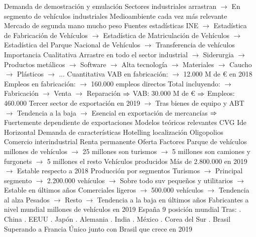 \documentclass{nuevotema}
\begin{document}
\begin{esquemal}
				\4[] Demanda de demostración y emulación
				\4[] Sectores industriales arrastran
				\4[] $\to$ En segmento de vehículos industriales
				\4[] Medioambiente cada vez más relevante
				\4[] Mercado de segunda mano mucho peso
				\4 Fuentes estadísticas
				\4[] INE
				\4[] $\to$ Estadística de Fabricación de Vehículos
				\4[] $\to$ Estadística de Matriculación de Vehículos
				\4[] $\to$ Estadística del Parque Nacional de Vehículos
				\4[] $\to$ Transferencia de vehículos
			\3 Importancia
				\4 Cualitativa
				\4[] Arrastre en todo el sector industrial
				\4[] $\to$ Siderurgia
				\4[] $\to$ Productos metálicos
				\4[] $\to$ Software
				\4[] $\to$ Alta tecnología
				\4[] $\to$ Materiales
				\4[] $\to$ Caucho
				\4[] $\to$ Plásticos
				\4[] $\to$ ...
				\4 Cuantitativa
				\4[] VAB en fabricación:
				\4[] $\to$ 12.000 M de € en 2018
				\4[] Empleos en fabricación:
				\4[] $\to$ 160.000 empleos directos
				\4[] Total incluyendo:
				\4[] $\to$ Fabricación
				\4[] $\to$ Venta
				\4[] $\to$ Reparación
				\4[] $\Rightarrow$ VAB: 30.000 M de €
				\4[] $\Rightarrow$ Empleos: 460.000
				\4[] Tercer sector de exportación en 2019
				\4[] $\to$ Tras bienes de equipo y ABT
				\4[] $\to$ Tendencia a la baja
				\4[] $\to$ Esencial en exportación de mercancías
				\4[] $\Rightarrow$ Fuertemente dependiente de exportaciones
			\3 Modelos teóricos relevantes
				\4 CVG
				\4 Ide Horizontal
				\4 Demanda de características
				\4 Hotelling localización
				\4 Oligopolios
				\4 Comercio interindustrial
				\4 Renta permanente
			\3 Oferta
				\4 Factores
				\4 Parque de vehículos
				 millones de vehículos
				\4[] $\to$ 25 millones son turismos
				\4[] $\to$ 5 millones son camiones y furgonets
				\4[] $\to$ 5 millones el resto
				\4 Vehículos producidos
				\4[] Más de 2.800.000 en 2019
				\4[] $\to$ Estable respecto a 2018
				\4 Producción por segmentos
				\4[] Turismos
				\4[] $\to$ Principal segmento
				\4[] $\to$ 2.200.000 vehículos
				\4[] $\to$ Sobre todo suv pequeños y utilitarios
				\4[] $\to$ Estable en últimos años
				\4[] Comerciales ligeros
				\4[] $\to$ 500.000 vehículos
				\4[] $\to$ Tendencia al alza
				\4[] Pesados
				\4[] $\to$ Resto
				\4[] $\to$ Tendencia a la baja en últimos años
				\4 Fabricantes a nivel mundial
				 millones de vehículos en 2019
				\4[] España 9 posición mundial
				\4[] Tras:
				. China
				. EEUU
				. Japón
				. Alemania
				. India
				. México
				. Corea del Sur
				. Brasil
				\4[] Superando a Francia
				\4[] Único junto con Brasil que crece en 2019

\end{esquemal}
\end{document}
